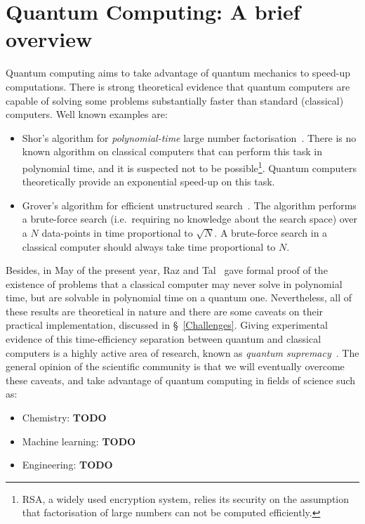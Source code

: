 \chapter{Quantum Computing: A brief overview}

Quantum computing aims to take advantage of quantum mechanics to speed-up computations. There is strong theoretical evidence that quantum computers are capable of solving some problems substantially faster than standard (classical) computers. Well known examples are:

\begin{itemize} 
  \item Shor's algorithm for \textit{polynomial-time} large number factorisation~\cite{Shor}. There is no known algorithm on classical computers that can perform this task in polynomial time, and it is suspected not to be possible\footnote{RSA, a widely used encryption system, relies its security on the assumption that factorisation of large numbers can not be computed efficiently.}. Quantum computers theoretically provide an exponential speed-up on this task.
  \item Grover's algorithm for efficient unstructured search~\cite{Grover}. The algorithm performs a brute-force search (i.e.\ requiring no knowledge about the search space) over a \(N\) data-points in time proportional to \(\sqrt{N}\). A brute-force search in a classical computer should always take time proportional to \(N\).
\end{itemize}

Besides, in May of the present year, Raz and Tal~\cite{BQPSepPH} gave formal proof of the existence of problems that a classical computer may never solve in polynomial time, but are solvable in polynomial time on a quantum one. Nevertheless, all of these results are theoretical in nature and there are some caveats on their practical implementation, discussed in \S~\ref{Challenges}. Giving experimental evidence of this time-efficiency separation between quantum and classical computers is a highly active area of research, known as \textit{quantum supremacy}~\cite{QSupremacySurvey}. The general opinion of the scientific community is that we will eventually overcome these caveats, and take advantage of quantum computing in fields of science such as:

\begin{itemize}
  \item Chemistry: \textbf{TODO}
  \item Machine learning: \textbf{TODO}
  \item Engineering: \textbf{TODO}
\end{itemize}

